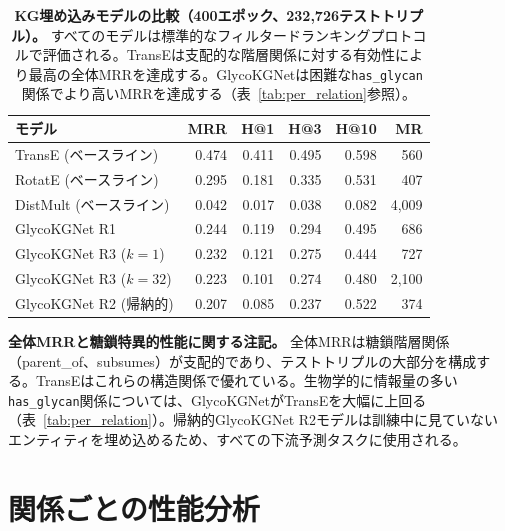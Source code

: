 \documentclass[11pt,a4paper]{ltjsarticle}
\begin{document}
\begin{table}[H]
\centering
\caption{\textbf{KG埋め込みモデルの比較（400エポック、232,726テストトリプル）。}
すべてのモデルは標準的なフィルタードランキングプロトコルで評価される。TransEは支配的な階層関係に対する有効性により最高の全体MRRを達成する。GlycoKGNetは困難な\texttt{has\_glycan}関係でより高いMRRを達成する（表~\ref{tab:per_relation}参照）。}
\label{tab:kg_baselines}
\small
\begin{tabular}{lrrrrr}
\toprule
\textbf{モデル} & \textbf{MRR} & \textbf{H@1} & \textbf{H@3} & \textbf{H@10} & \textbf{MR} \\
\midrule
TransE (ベースライン)    & 0.474 & 0.411 & 0.495 & 0.598 & 560 \\
RotatE (ベースライン)    & 0.295 & 0.181 & 0.335 & 0.531 & 407 \\
DistMult (ベースライン)  & 0.042 & 0.017 & 0.038 & 0.082 & 4,009 \\
\midrule
GlycoKGNet R1        & 0.244 & 0.119 & 0.294 & 0.495 & 686 \\
GlycoKGNet R3 ($k=1$)  & 0.232 & 0.121 & 0.275 & 0.444 & 727 \\
GlycoKGNet R3 ($k=32$) & 0.223 & 0.101 & 0.274 & 0.480 & 2,100 \\
\midrule
GlycoKGNet R2 (帰納的) & 0.207 & 0.085 & 0.237 & 0.522 & 374 \\
\bottomrule
\end{tabular}
\end{table}

\textbf{全体MRRと糖鎖特異的性能に関する注記。}
全体MRRは糖鎖階層関係（parent\_of、subsumes）が支配的であり、テストトリプルの大部分を構成する。TransEはこれらの構造関係で優れている。生物学的に情報量の多い\texttt{has\_glycan}関係については、GlycoKGNetがTransEを大幅に上回る（表~\ref{tab:per_relation}）。帰納的GlycoKGNet R2モデルは訓練中に見ていないエンティティを埋め込めるため、すべての下流予測タスクに使用される。

\section{関係ごとの性能分析}
\label{sec:per_relation}
\end{document}
